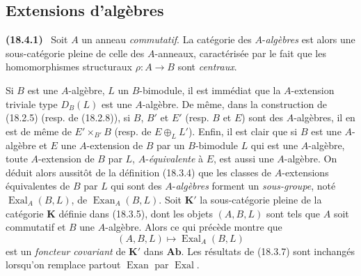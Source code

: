 \documentclass[10pt,oneside]{book}
\makeatletter
\newcommand{\setmanualcurrentlabel}[1]{\def\@currentlabel{#1}}
\newenvironment{env}[1][]{\setmanualcurrentlabel{#1}\par\medskip\noindent\textbf{(#1)}\ }{\par}
\makeatother
\begin{document}
\subsection{Extensions d'algèbres}
\label{subsection:0.18.4-fr}

\begin{env}[18.4.1]
\label{0.18.4.1-fr}
Soit $A$ un anneau \emph{commutatif}. La catégorie des $A$-\emph{algèbres} est
alors une sous-catégorie pleine de celle des $A$-anneaux, caractérisée par le
fait que les homomorphismes structuraux $\rho:A\to B$ sont \emph{centraux}.

Si $B$ est une $A$-algèbre, $L$ un $B$-bimodule, il est immédiat que la
$A$-extension triviale type $D_B(L)$ est une $A$-algèbre. De même, dans la
construction de (18.2.5) (resp. de (18.2.8)), si $B$, $B'$ et $E'$ (resp.
$B$ et $E$) sont des $A$-algèbres, il en est de même de
$E'\times_{B'}B$ (resp. de $E\oplus_LL'$). Enfin, il est clair que si $B$ est
une $A$-algèbre et $E$ une $A$-extension de $B$ par un $B$-bimodule $L$ qui
est une $A$-algèbre, toute $A$-extension de $B$ par $L$, $A$-\emph{équivalente}
à $E$, est aussi une $A$-algèbre. On déduit alors aussitôt de la définition
(18.3.4) que les classes de $A$-extensions équivalentes de $B$ par $L$ qui
sont des $A$-\emph{algèbres} forment un \emph{sous-groupe}, noté
$\operatorname{Exal}_A(B,L)$, de $\operatorname{Exan}_A(B,L)$. Soit
$\mathbf K'$ la sous-catégorie pleine de la catégorie $\mathbf K$ définie dans
(18.3.5), dont les objets $(A,B,L)$ sont tels que $A$ soit commutatif et $B$
une $A$-algèbre. Alors ce qui précède montre que
\[
  (A,B,L)\longmapsto\operatorname{Exal}_A(B,L)
\]
est un \emph{foncteur covariant} de $\mathbf K'$ dans $\mathbf{Ab}$. Les
résultats de (18.3.7) sont inchangés lorsqu'on remplace partout
$\operatorname{Exan}$ par $\operatorname{Exal}$.
\end{env}
\end{document}

